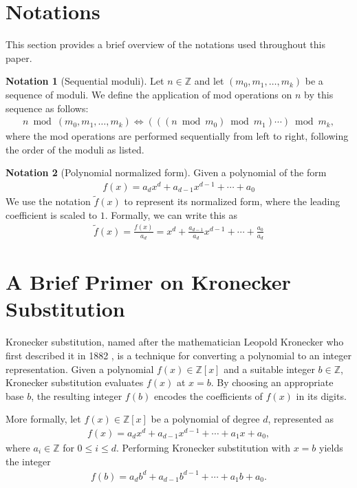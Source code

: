 \documentclass[12pt,reqno]{article}
\theoremstyle{plain}
\theoremstyle{definition}
\newtheorem{notation}{Notation}
\begin{document}
\section{Notations} \label{section:notations}
This section provides a brief overview of the notations used throughout this paper.

\begin{notation}[Sequential moduli]
Let $n \in \mathbb{Z}$ and let $(m_0, m_1, \ldots, m_k)$ be a sequence of moduli. We define the application of mod operations on $n$ by this sequence as follows:
\begin{align*}
    n \bmod{(m_0, m_1, \ldots, m_k)} \Longleftrightarrow  (((n \bmod{m_0}) \bmod{m_1}) \cdots ) \bmod{m_k},
\end{align*}
where the mod operations are performed sequentially from left to right, following the order of the moduli as listed.
\end{notation}

\begin{notation}[Polynomial normalized form]

Given a polynomial of the form
\begin{align*}
f(x) = a_d x^d + a_{d-1} x^{d-1} + \cdots + a_0
\end{align*}
We use the notation $\tilde{f}(x)$ to represent its normalized form, where the leading coefficient is scaled to $1$. Formally, we can write this as
\begin{align*}
    \tilde{f}(x) = \frac{f(x)}{a_d} = x^d + \frac{a_{d-1}}{a_d} x^{d-1} + \cdots + \frac{a_0}{a_d}
\end{align*}
\end{notation}

\section{A Brief Primer on Kronecker Substitution} \label{section:kronecker}
Kronecker substitution, named after the mathematician Leopold Kronecker who first described it in 1882 \cite{kronecker1882}, is a technique for converting a polynomial to an integer representation. Given a polynomial $f(x) \in \mathbb{Z}[x]$ and a suitable integer $b \in \mathbb{Z}$, Kronecker substitution evaluates $f(x)$ at $x = b$. By choosing an appropriate base $b$, the resulting integer $f(b)$ encodes the coefficients of $f(x)$ in its digits.

More formally, let $f(x) \in \mathbb{Z}[x]$ be a polynomial of degree $d$, represented as
\begin{align*}
f(x) = a_d x^d + a_{d-1} x^{d-1} + \cdots + a_1 x + a_0,
\end{align*}
where $a_i \in \mathbb{Z}$ for $0 \leq i \leq d$. Performing Kronecker substitution with $x = b$ yields the integer
\begin{align*}
f(b) = a_d b^d + a_{d-1} b^{d-1} + \cdots + a_1 b + a_0.
\end{align*}
\end{document}

